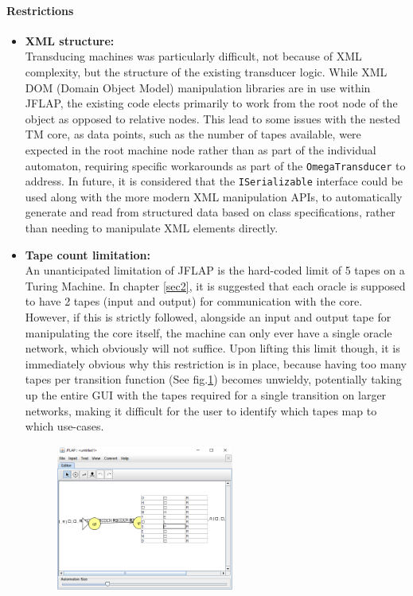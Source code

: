 \documentclass[12pt]{article}
\newcommand{\xmark}{\ding{55}}
\begin{document}
		\paragraph{Restrictions}		
		\begin{itemize}
			\item[\xmark] \textbf{XML structure:\\}
				Transducing machines was particularly difficult, not because of XML complexity, but the structure of the existing transducer logic.
				While XML DOM (Domain Object Model) manipulation libraries are in use within JFLAP, the existing code elects primarily to work from the root node of the object as opposed to relative nodes.
				This lead to some issues with the nested TM core, as data points, such as the number of tapes available, were expected in the root machine node rather than as part of the individual automaton, requiring specific workarounds as part of the \texttt{OmegaTransducer} to address.
				In future, it is considered that the \texttt{ISerializable} interface could be used along with the more modern XML manipulation APIs, to automatically generate and read from structured data based on class specifications, rather than needing to manipulate XML elements directly.
			\item[\xmark] \textbf{Tape count limitation:\\}
				An unanticipated limitation of JFLAP is the hard-coded limit of 5 tapes on a Turing Machine. In chapter \ref{sec2}, it is suggested that each oracle is supposed to have 2 tapes (input and output) for communication with the core.
				However, if this is strictly followed, alongside an input and output tape for manipulating the core itself, the machine can only ever have a single oracle network, which obviously will not suffice.
				Upon lifting this limit though, it is immediately obvious why this restriction is in place, because having too many tapes per transition function (See fig.\ref{messy-tapes}) becomes unwieldy, potentially taking up the entire GUI with the tapes required for a single transition on larger networks, making it difficult for the user to identify which tapes map to which use-cases.
				\begin{figure}\label{messy-tapes}
					\centering
					\includegraphics[width=0.55\textwidth]{messy-tapes}

\end{figure}
\end{itemize}
\end{document}
